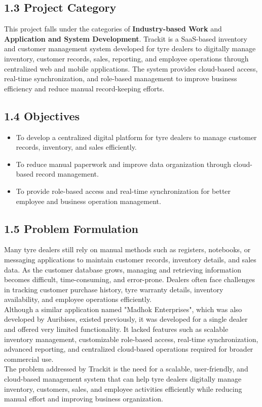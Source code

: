 \documentclass[12pt, oneside]{article}
\begin{document}
\subsection*{1.3 Project Category}
This project falls under the categories of \textbf{Industry-based Work} and \textbf{Application and System Development}. Trackit is a SaaS-based inventory and customer management system developed for tyre dealers to digitally manage inventory, customer records, sales, reporting, and employee operations through centralized web and mobile applications. The system provides cloud-based access, real-time synchronization, and role-based management to improve business efficiency and reduce manual record-keeping efforts.
\subsection*{1.4 Objectives}
\begin{itemize}
    \item To develop a centralized digital platform for tyre dealers to manage customer records, inventory, and sales efficiently.
    \item To reduce manual paperwork and improve data organization through cloud-based record management.
    \item To provide role-based access and real-time synchronization for better employee and business operation management. 
\end{itemize}
\subsection*{1.5 Problem Formulation}
Many tyre dealers still rely on manual methods such as registers, notebooks, or messaging applications to maintain customer records, inventory details, and sales data. As the customer database grows, managing and retrieving information becomes difficult, time-consuming, and error-prone. Dealers often face challenges in tracking customer purchase history, tyre warranty details, inventory availability, and employee operations efficiently.\\[0.25cm]
Although a similar application named "Madhok Enterprises", which was also developed by Auribises, existed previously, it was developed for a single dealer and offered very limited functionality. It lacked features such as scalable inventory management, customizable role-based access, real-time synchronization, advanced reporting, and centralized cloud-based operations required for broader commercial use.\\[0.25cm]
The problem addressed by Trackit is the need for a scalable, user-friendly, and cloud-based management system that can help tyre dealers digitally manage inventory, customers, sales, and employee activities efficiently while reducing manual effort and improving business organization.
\end{document}
